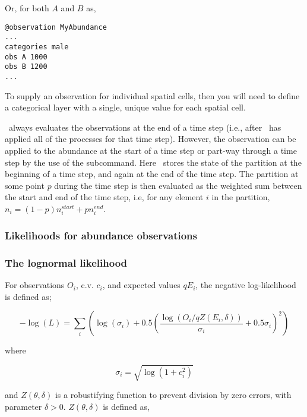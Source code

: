 Or, for both $A$ and $B$ as,

\begin{verbatim}
@observation MyAbundance
...
categories male
obs A 1000
obs B 1200
...
\end{verbatim}

To supply an observation for individual spatial cells, then you will need to define a categorical layer with a single, unique value for each spatial cell. 

\SPM\ always evaluates the observations at the end of a time step (i.e., after \SPM\ has applied all of the processes for that time step). However, the observation can be applied to the abundance at the start of a time step or part-way through a time step by the use of the  subcommand. Here \SPM\ stores the state of the partition at the beginning of a time step, and again at the end of the time step. The partition at some point $p$ during the time step is then evaluated as the weighted sum between the start and end of the time step, i.e, for any element $i$ in the partition, $n_i=(1-p) n_i^{start} + p n_i^{end}$.

\subsubsection{Likelihoods for abundance observations}

\subsubsection*{The lognormal likelihood}

For observations $O_i$, c.v. $c_i$, and expected values $qE_i$, the negative log-likelihood is defined as;

\begin{equation}
 - \log \left(L \right) = \sum\limits_i \left( \log \left( \sigma _i \right) + 0.5\left( \frac{\log \left(O_i / q Z \left(E_i,\delta \right) \right)}{\sigma_i} + 0.5 \sigma_i \right)^2 \right)
\end{equation}

where 

\begin{equation}
  \sigma_i  = \sqrt{\log \left(1+c_i^2 \right)}
\end{equation}

and $Z \left(\theta,\delta \right)$ is a robustifying function to prevent division by zero errors, with parameter $\delta>0$. $Z \left(\theta,\delta \right)$ is defined as,

